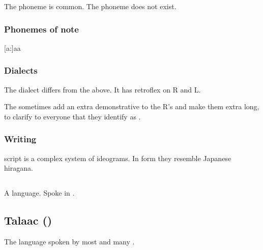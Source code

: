 The phoneme \txipa{[T]} is common. 
The phoneme \txipa{[p]} does not exist. 









\begin{pronunciationenvironment}{\subsubsection{Phonemes of note}}
  \pitem{\ahresphan}   {[a:]}{aa}
  \pitem{\aflatresphan}{[\ae]}{\aumlaut}
\end{pronunciationenvironment}





\subsubsection{Dialects}
The \Mystraacht{} dialect differs from the above. 
It has retroflex on R and L. 

The \CiriathSepher{} sometimes add an extra demonstrative  to the R's and make them extra long, to clarify to everyone that they identify as \CiriathSepher. 





\subsubsection{Writing}
\Resphan{} script is a complex system of ideograms. 
In form they resemble Japanese hiragana. 









\subsection{\Saphyr}
\index{\Saphyr}
A \caisith language. 
Spoke in . 









\subsection{Talaac (\Draconic)}
The language spoken by most \dragons and many \ophidians. 

